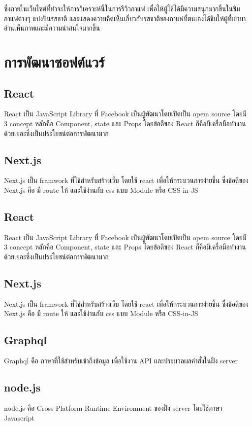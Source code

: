 ซึ่งภายในเว็บไซต์ที่ทำจะให้การวิเคราะห์นี้ในการรีวิวกาแฟ เพื่อให้ผู้ใช้ได้มีความสนุกมากขึ้นในชิมกาแฟต่างๆ แบ่งปันรสชาติ และแสดงความคิดเห็นเกี่ยวกับรสชาติของกาแฟที่ตนเองได้ชิมให้ผู้ที่เข้ามาอ่านเห็นภาพและมีความน่าสนใจมากขึ้น

\section{การพัฒนาซอฟต์แวร์}
\subsection{React}
React เป็น JavaScript Library ที่ Facebook เป็นผู้พัฒนาโดยเปิดเป็น opem source โดยมี 3 concept หลักคือ Component, state และ Props โดยข้อดีของ React ก็คือมีเครื่อมือทำงานด้วยเยอะซึ่งเป็นประโยชน์ต่อการพัฒนามาก

\subsection{Next.js}
Next.js เป็น framwork ที่ใช้สำหรับสร้างเว็บ โดยใช้ react เพื่อให้กระบวนการง่ายขึ้น ซึ่งข้อดีของ Next.js คือ มี route ให้ และใช้ง่านกับ css แบบ Module หรือ CSS-in-JS

\subsection{React}
React เป็น JavaScript Library ที่ Facebook เป็นผู้พัฒนาโดยเปิดเป็น opem source โดยมี 3 concept หลักคือ Component, state และ Props โดยข้อดีของ React ก็คือมีเครื่อมือทำงานด้วยเยอะซึ่งเป็นประโยชน์ต่อการพัฒนามาก \cite{react}

\subsection{Next.js}
Next.js เป็น framwork ที่ใช้สำหรับสร้างเว็บ โดยใช้ react เพื่อให้กระบวนการง่ายขึ้น ซึ่งข้อดีของ Next.js คือ มี route ให้ และใช้ง่านกับ css แบบ Module หรือ CSS-in-JS \cite{nextjs}

\subsection{Graphql}
Graphql คือ ภาษาที่ใช้สำหรับเข้าถึงข้อมูล เพื่อใช้งาน API และประมวลผลคำสั่งในฝั่ง server \cite{graphql}

\subsection{node.js}
node.js คือ  Cross Platform Runtime Environment ของฝั่ง server โดยใช้ภาษา Javascript \cite{nodejs}

